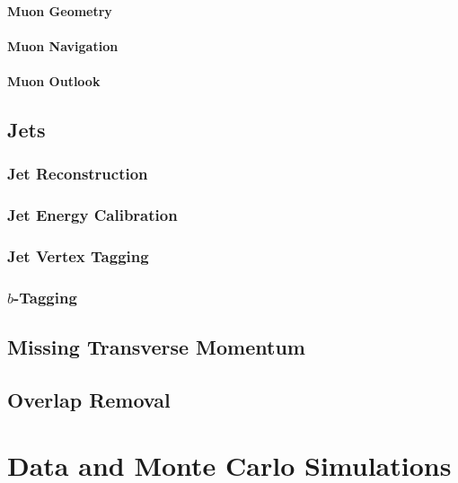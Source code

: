 \documentclass{umassthesis}          %
\begin{document}
\subsubsection{Muon Geometry}\label{sec:reco_muon_geometry}

\subsubsection{Muon Navigation}\label{sec:reco_muon_nav}

\subsubsection{Muon Outlook}\label{sec:muon_outlook}


\section{Jets}\label{sec:reco_jets}

\subsection{Jet Reconstruction}\label{sec:reco_pflow}

\subsection{Jet Energy Calibration}\label{sec:reco_jet_calibration}

\subsection{Jet Vertex Tagging}\label{sec:reco_jvt_fjvt}

\subsection{\texorpdfstring{$b$-Tagging}{b-Tagging}}\label{sec:reco_btagging}

\section{Missing Transverse Momentum}\label{sec:reco_met}

\section{Overlap Removal}\label{sec:reco_overlap_removal}


\chapter{Data and Monte Carlo Simulations}\label{ch:data_mc}
\end{document}
